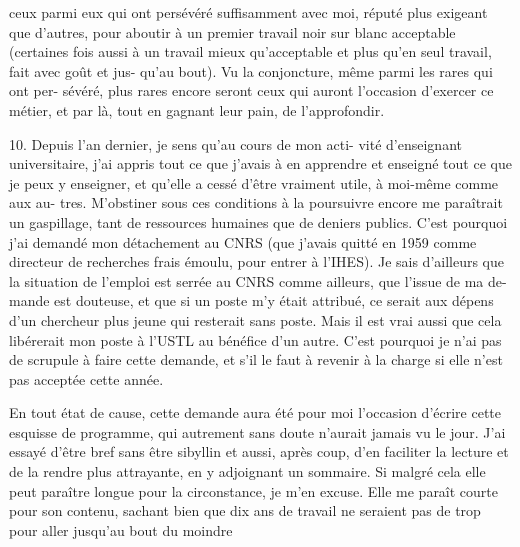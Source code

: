 
ceux parmi eux qui ont persévéré suffisamment avec moi, réputé
plus exigeant que d'autres, pour aboutir à un premier travail
noir sur blanc acceptable (certaines fois aussi à un travail mieux
qu'acceptable et plus qu'en seul travail, fait avec goût et jus-%
qu'au bout). Vu la conjoncture, même parmi les rares qui ont per-%
sévéré, plus rares encore seront ceux qui auront l'occasion
d'exercer ce métier, et par là, tout en gagnant leur pain, de
l'approfondir.

10. Depuis l'an dernier, je sens qu'au cours de mon acti-%
vité d'enseignant universitaire, j'ai appris tout ce que j'avais
à en apprendre et enseigné tout ce que je peux y enseigner, et
qu'elle a cessé d'être vraiment utile, à moi-même comme aux au-%
tres. M'obstiner sous ces conditions à la poursuivre encore me
paraîtrait un gaspillage, tant de ressources humaines que de deniers
publics. C'est pourquoi j'ai demandé mon détachement au CNRS (que
j'avais quitté en 1959 comme directeur de recherches frais émoulu,
pour entrer à l'IHES). Je sais d'ailleurs que la situation de
l'emploi est serrée au CNRS comme ailleurs, que l'issue de ma de-%
mande est douteuse, et que si un poste m'y était attribué, ce serait
aux dépens d'un chercheur plus jeune qui resterait sans poste.
Mais il est vrai aussi que cela libérerait mon poste à l'USTL au
bénéfice d'un autre. C'est pourquoi je n'ai pas de scrupule à
faire cette demande, et s'il le faut à revenir à la charge si elle
n'est pas acceptée cette année.

En tout état de cause, cette demande aura été pour moi
l'occasion d'écrire cette esquisse de programme, qui autrement sans
doute n'aurait jamais vu le jour. J'ai essayé d'être bref sans être
sibyllin et aussi, après coup, d'en faciliter la lecture et de
la rendre plus attrayante, en y adjoignant un sommaire. Si malgré
cela elle peut paraître longue pour la circonstance, je m'en excuse.
Elle me paraît courte pour son contenu, sachant bien que dix ans de
travail ne seraient pas de trop pour aller jusqu'au bout du moindre

